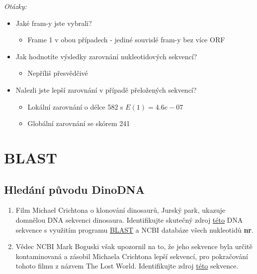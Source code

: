 \documentclass[11pt]{article}
\begin{document}
\emph{Otázky:}
\begin{itemize}
\item Jaké fram-y jste vybrali?
\begin{itemize}
\item Frame 1 v obou případech - jediné souvislé fram-y bez více ORF
\end{itemize}
\item Jak hodnotíte výsledky zarovnání nukleotidových sekvencí?
\begin{itemize}
\item Nepříliš přesvědčivé
\end{itemize}
\item Nalezli jste lepší zarovnání v případě přeložených sekvencí?
\begin{itemize}
\item Lokální zarovnání o délce 582 s \(E(1) = 4.6e-07\)
\item Globální zarovnání se skórem 241
\end{itemize}
\end{itemize}

\section{BLAST}
\label{sec:org1f165fa}
\subsection{Hledání původu DinoDNA}
\label{sec:org273d1c2}
\begin{enumerate}
\item Film Michael Crichtona o klonování dinosaurů, Jurský park, ukazuje domnělou
DNA sekvenci dinosaura. Identifikujte skutečný zdroj \href{data/dino\_dna1.fasta}{této} DNA sekvence s
využitím programu \href{https://blast.ncbi.nlm.nih.gov/Blast.cgi?PROGRAM=blastn\&PAGE\_TYPE=BlastSearch\&LINK\_LOC=blasthome}{BLAST} a NCBI databáze všech nukleotidů \textbf{nr}.
\item Vědec NCBI Mark Boguski však upozornil na to, že jeho sekvence byla určitě
kontaminovaná a zásobil Michaela Crichtona lepší sekvencí, pro pokračování
tohoto filmu z názvem The Lost World. Identifikujte zdroj \href{data/dino\_dna2.fasta}{této} sekvence.
\end{enumerate}
\end{document}
